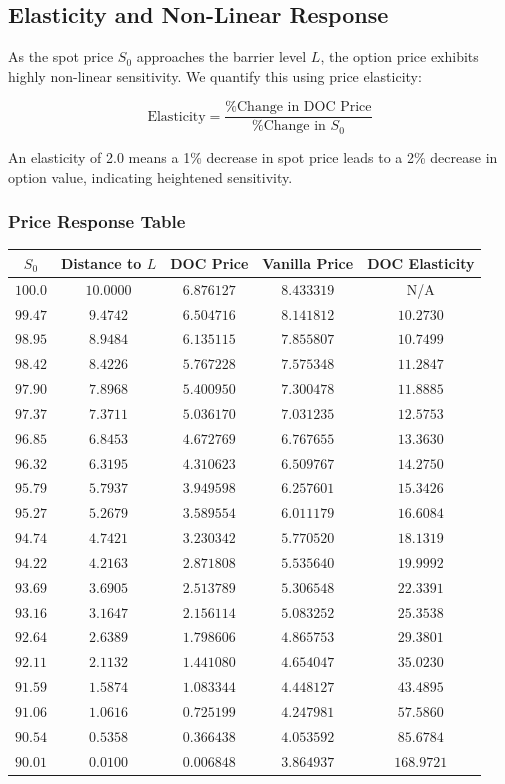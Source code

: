 \documentclass{report}
\begin{document}
\subsection{Elasticity and Non-Linear Response}

As the spot price $S_0$ approaches the barrier level $L$, the option price exhibits highly non-linear sensitivity. We quantify this using price elasticity:

$$\text{Elasticity} = \frac{\text{\% Change in DOC Price}}{\text{\% Change in } S_0}$$

An elasticity of 2.0 means a 1\% decrease in spot price leads to a 2\% decrease in option value, indicating heightened sensitivity.

\subsubsection{Price Response Table}

\begin{center}
\begin{tabular}{ccccc}
\toprule
$S_0$ & Distance to $L$ & DOC Price & Vanilla Price & DOC Elasticity \\
\midrule
$100.0$ & $10.0000$ & $6.876127$ & $8.433319$ & N/A \\
$99.47$ & $9.4742$ & $6.504716$ & $8.141812$ & $10.2730$ \\
$98.95$ & $8.9484$ & $6.135115$ & $7.855807$ & $10.7499$ \\
$98.42$ & $8.4226$ & $5.767228$ & $7.575348$ & $11.2847$ \\
$97.90$ & $7.8968$ & $5.400950$ & $7.300478$ & $11.8885$ \\
$97.37$ & $7.3711$ & $5.036170$ & $7.031235$ & $12.5753$ \\
$96.85$ & $6.8453$ & $4.672769$ & $6.767655$ & $13.3630$ \\
$96.32$ & $6.3195$ & $4.310623$ & $6.509767$ & $14.2750$ \\
$95.79$ & $5.7937$ & $3.949598$ & $6.257601$ & $15.3426$ \\
$95.27$ & $5.2679$ & $3.589554$ & $6.011179$ & $16.6084$ \\
$94.74$ & $4.7421$ & $3.230342$ & $5.770520$ & $18.1319$ \\
$94.22$ & $4.2163$ & $2.871808$ & $5.535640$ & $19.9992$ \\
$93.69$ & $3.6905$ & $2.513789$ & $5.306548$ & $22.3391$ \\
$93.16$ & $3.1647$ & $2.156114$ & $5.083252$ & $25.3538$ \\
$92.64$ & $2.6389$ & $1.798606$ & $4.865753$ & $29.3801$ \\
$92.11$ & $2.1132$ & $1.441080$ & $4.654047$ & $35.0230$ \\
$91.59$ & $1.5874$ & $1.083344$ & $4.448127$ & $43.4895$ \\
$91.06$ & $1.0616$ & $0.725199$ & $4.247981$ & $57.5860$ \\
$90.54$ & $0.5358$ & $0.366438$ & $4.053592$ & $85.6784$ \\
$90.01$ & $0.0100$ & $0.006848$ & $3.864937$ & $168.9721$ \\
\bottomrule
\end{tabular}
\end{center}
\end{document}
